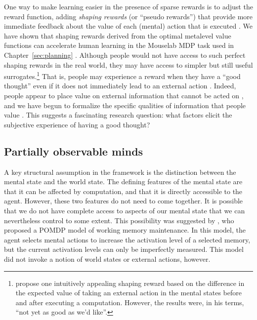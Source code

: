 One way to make learning easier in the presence of sparse rewards is to adjust the reward function, adding \emph{shaping rewards} (or ``pseudo rewards'') that provide more immediate feedback about the value of each (mental) action that is executed \citep{ng1999policy}. We have shown that shaping rewards derived from the optimal metalevel value functions can accelerate human learning in the Mouselab MDP task used in Chapter~\ref{sec:planning} \citep{callaway2022leveraging}. Although people would not have access to such perfect shaping rewards in the real world, they may have access to simpler but still useful surrogates.\footnote{%
  \citet{hay2016principles} propose one intuitively appealing shaping reward based on the difference in the expected value of taking an external action in the mental states before and after executing a computation. However, the results were, in his terms, ``not yet as good as we’d like''.
} That is, people may experience a reward when they have a ``good thought'' even if it does not immediately lead to an external action \citep{gopnik1998explanation}. Indeed, people appear to place value on external information that cannot be acted on \citep{eliaz2007experimental,gottlieb2018neuroscience}, and we have begun to formalize the specific qualities of information that people value \citep{markant2014preference,markant2016selfdirected}. This suggests a fascinating research question: what factors elicit the subjective experience of having a good thought?


\subsection{Partially observable minds}


A key structural assumption in the framework is the distinction between the mental state and the world state. The defining features of the mental state are that it can be affected by computation, and that it is directly accessible to the agent. However, these two features do not need to come together. It is possible that we do not have complete access to aspects of our mental state that we can nevertheless control to some extent. This possibility was suggested by \citet{suchow2016deciding}, who proposed a POMDP model of working memory maintenance. In this model, the agent selects mental actions to increase the activation level of a selected memory, but the current activation levels can only be imperfectly measured. This model did not invoke a notion of world states or external actions, however.

